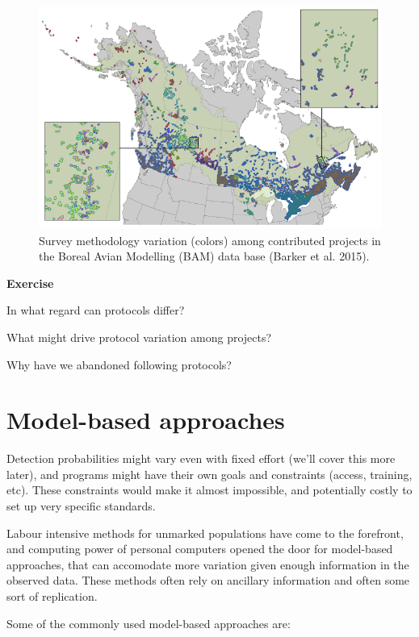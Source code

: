 \documentclass[12pt,]{book}
\let\BeginKnitrBlock\begin \let\EndKnitrBlock\end
\begin{document}
\begin{figure}
\includegraphics[width=0.8\linewidth]{./images/barker-2015-fig-2} \caption{Survey methodology variation (colors) among contributed projects in the Boreal Avian Modelling (BAM) data base (Barker et al. 2015).}\label{fig:intro-2}
\end{figure}

\BeginKnitrBlock{rmdexercise}
\textbf{Exercise}

In what regard can protocols differ?

What might drive protocol variation among projects?

Why have we abandoned following protocols?
\EndKnitrBlock{rmdexercise}

\hypertarget{model-based-approaches}{%
\section{Model-based approaches}\label{model-based-approaches}}

Detection probabilities might vary even with fixed effort
(we'll cover this more later),
and programs might have their own goals and constraints (access, training, etc).
These constraints would make it almost impossible, and potentially costly
to set up very specific standards.

Labour intensive methods for unmarked populations
have come to the forefront, and computing power of
personal computers opened the door for model-based approaches,
that can accomodate more variation given enough information
in the observed data. These methods often rely on ancillary
information and often some sort of replication.

Some of the commonly used model-based approaches are:
\end{document}
